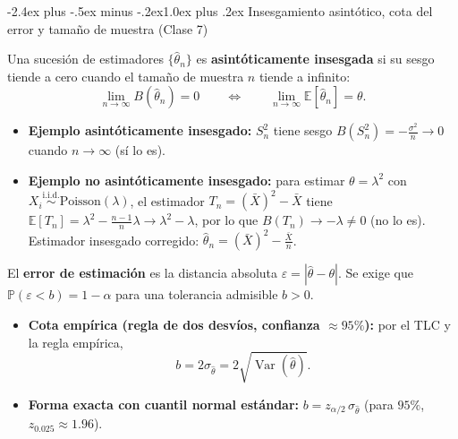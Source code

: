 \documentclass[10pt,a4paper]{article}
\makeatletter
\newcommand{\E}{\mathbb{E}}
\newcommand{\Prob}{\mathbb{P}}
\newcommand{\Var}{\operatorname{Var}}
\newcommand{\iid}{\overset{\text{i.i.d.}}{\sim}}
\renewcommand\section{\@startsection{section}{1}{0pt}%
  {-2.4ex plus -.5ex minus -.2ex}{1.0ex plus .2ex}%
  {\normalfont\large\bfseries\color{seccolor}}}
\makeatother
\begin{document}
\section{Insesgamiento asintótico, cota del error y tamaño de muestra \textmd{(Clase 7)}}

\begin{defbox}[frametitle={Estimador asintóticamente insesgado}]
Una sucesión de estimadores $\{\hat\theta_n\}$ es \textbf{asintóticamente insesgada} si su sesgo tiende a cero cuando el tamaño de muestra $n$ tiende a infinito:
\[
\lim_{n\to\infty} B(\hat\theta_n) = 0
\qquad\Longleftrightarrow\qquad
\lim_{n\to\infty} \E[\hat\theta_n] = \theta .
\]
\begin{itemize}
  \item \textbf{Ejemplo asintóticamente insesgado:} $S_n^2$ tiene sesgo $B(S_n^2) = -\frac{\sigma^2}{n} \to 0$ cuando $n\to\infty$ (sí lo es).
  \item \textbf{Ejemplo no asintóticamente insesgado:} para estimar $\theta = \lambda^2$ con $X_i\iid\text{Poisson}(\lambda)$, el estimador $T_n = (\bar X)^2 - \bar X$ tiene $\E[T_n] = \lambda^2 - \frac{n-1}{n}\lambda \to \lambda^2 - \lambda$, por lo que $B(T_n) \to -\lambda \ne 0$ (no lo es). Estimador insesgado corregido: $\hat\theta_n = (\bar X)^2 - \frac{\bar X}{n}$.
\end{itemize}
\end{defbox}

\begin{defbox}[frametitle={Error de estimación y cota $b$}]
El \textbf{error de estimación} es la distancia absoluta $\varepsilon = |\hat\theta - \theta|$. Se exige que $\Prob(\varepsilon < b) = 1-\alpha$ para una tolerancia admisible $b > 0$.
\begin{itemize}
  \item \textbf{Cota empírica (regla de dos desvíos, confianza $\approx 95\%$):} por el TLC y la regla empírica,
  \[
  b = 2\sigma_{\hat\theta} = 2\sqrt{\Var(\hat\theta)}.
  \]
  \item \textbf{Forma exacta con cuantil normal estándar:} $b = z_{\alpha/2}\,\sigma_{\hat\theta}$ (para $95\%$, $z_{0.025} \approx 1.96$).
\end{itemize}
\end{defbox}
\end{document}
